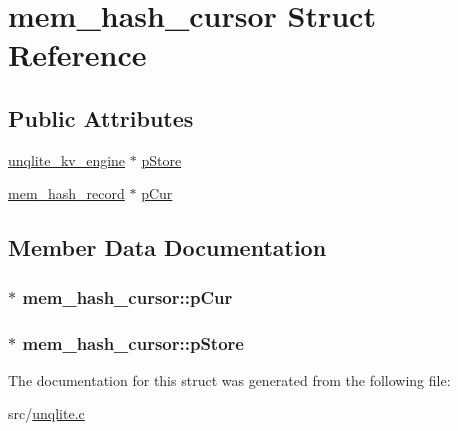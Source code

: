 \hypertarget{structmem__hash__cursor}{\section{mem\-\_\-hash\-\_\-cursor Struct Reference}
\label{d8/dd6/structmem__hash__cursor}
}
\subsection*{Public Attributes}
\begin{DoxyCompactItemize}
\item 
\hyperlink{structunqlite__kv__engine}{unqlite\-\_\-kv\-\_\-engine} $\ast$ \hyperlink{structmem__hash__cursor_a84cefae4f491b264319bbdd3c419e5a5}{p\-Store}
\item 
\hyperlink{structmem__hash__record}{mem\-\_\-hash\-\_\-record} $\ast$ \hyperlink{structmem__hash__cursor_a07632cb938e8247627a3077fde060da0}{p\-Cur}
\end{DoxyCompactItemize}


\subsection{Member Data Documentation}
\hypertarget{structmem__hash__cursor_a07632cb938e8247627a3077fde060da0}{
\subsubsection[{p\-Cur}]{$\ast$ mem\-\_\-hash\-\_\-cursor\-::p\-Cur}}\label{d8/dd6/structmem__hash__cursor_a07632cb938e8247627a3077fde060da0}
\hypertarget{structmem__hash__cursor_a84cefae4f491b264319bbdd3c419e5a5}{
\subsubsection[{p\-Store}]{$\ast$ mem\-\_\-hash\-\_\-cursor\-::p\-Store}}\label{d8/dd6/structmem__hash__cursor_a84cefae4f491b264319bbdd3c419e5a5}


The documentation for this struct was generated from the following file\-:\begin{DoxyCompactItemize}
\item 
src/\hyperlink{unqlite_8c}{unqlite.\-c}\end{DoxyCompactItemize}
